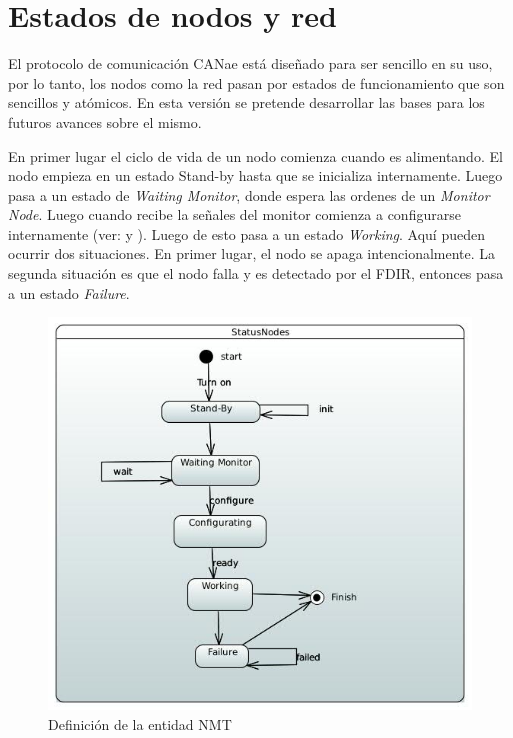 \section{Estados de nodos y red}
El protocolo de comunicación CANae está diseñado para ser sencillo en su uso,
por lo tanto, los nodos como la red pasan por estados de funcionamiento
que son sencillos y atómicos. En esta versión se pretende desarrollar las bases
para los futuros avances sobre el mismo.

En primer lugar el ciclo de vida de un nodo comienza cuando es alimentando. El
nodo empieza en un estado Stand-by hasta que se inicializa internamente. Luego
pasa a un estado de \textit{Waiting Monitor}, donde espera las ordenes de un
\textit{Monitor Node}.  Luego cuando recibe la señales del monitor comienza a
configurarse internamente (ver: \label{Appendix:DBT} y \label{Appendix:NMT}).
Luego de esto pasa a un estado \textit{Working}. Aquí pueden ocurrir dos
situaciones. En primer lugar, el nodo se apaga intencionalmente. La segunda
situación es que el nodo falla y es detectado por el \ac{FDIR}, entonces pasa
a un estado \textit{Failure}.

\begin{figure}[h!]
 \centering
 \includegraphics[scale=0.4]{images/Secciones/AppendixA/StatusNode.JPG}
  \caption{Definición de la entidad NMT}
\label{fig:NodeStatus}
\end{figure}

